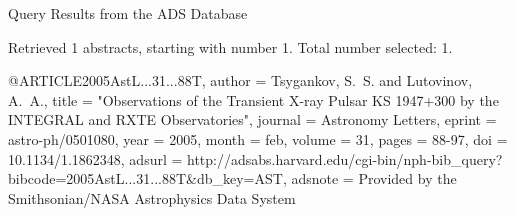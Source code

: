 Query Results from the ADS Database


Retrieved 1 abstracts, starting with number 1.  Total number selected: 1.

@ARTICLE{2005AstL...31...88T,
   author = {{Tsygankov}, S.~S. and {Lutovinov}, A.~A.},
    title = "{Observations of the Transient X-ray Pulsar KS 1947+300 by the INTEGRAL and RXTE Observatories}",
  journal = {Astronomy Letters},
   eprint = {astro-ph/0501080},
     year = 2005,
    month = feb,
   volume = 31,
    pages = {88-97},
      doi = {10.1134/1.1862348},
   adsurl = {http://adsabs.harvard.edu/cgi-bin/nph-bib_query?bibcode=2005AstL...31...88T&db_key=AST},
  adsnote = {Provided by the Smithsonian/NASA Astrophysics Data System}
}


